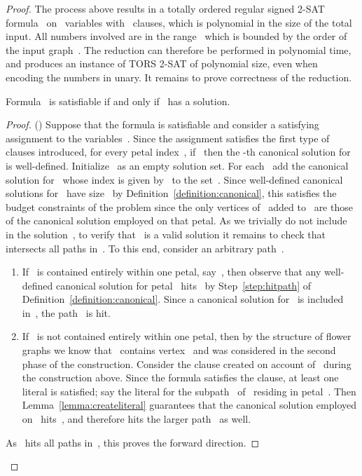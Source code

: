 \let\accentvec\vec  \documentclass{llncs}
\newcommand{\TORSTwoSat}{\textsc{TORS 2-SAT}\xspace}
\begin{document}
\begin{proof}
The process above results in a totally ordered regular signed 2-SAT formula~ on~ variables with~ clauses, which is polynomial in the size of the total input. All numbers involved are in the range~ which is bounded by the order of the input graph~. The reduction can therefore be performed in polynomial time, and produces an instance of \TORSTwoSat of polynomial size, even when encoding the numbers in unary. It remains to prove correctness of the reduction.

\begin{claim}
Formula~ is satisfiable if and only if~ has a solution.
\end{claim}
\begin{proof}
() Suppose that the formula is satisfiable and consider a satisfying assignment to the variables~. Since the assignment satisfies the first type of clauses introduced, for every petal index~, if~ then the -th canonical solution for~ is well-defined. Initialize~ as an empty solution set. For each~ add the canonical solution for~ whose index is given by~ to the set~. Since well-defined canonical solutions for~ have size~ by Definition~\ref{definition:canonical}, this satisfies the budget constraints of the problem since the only vertices of~ added to~ are those of the canonical solution employed on that petal. As we trivially do not include~ in the solution~, to verify that~ is a valid solution it remains to check that~ intersects all paths in~. To this end, consider an arbitrary path~.

\begin{enumerate}
	\item If~ is contained entirely within one petal, say~, then observe that any well-defined canonical solution for petal~ hits~ by Step~\ref{step:hitpath} of Definition~\ref{definition:canonical}. Since a canonical solution for~ is included in~, the path~ is hit.
	\item If~ is not contained entirely within one petal, then by the structure of flower graphs we know that~ contains vertex~ and was considered in the second phase of the construction. Consider the clause created on account of~ during the construction above. Since the formula satisfies the clause, at least one literal is satisfied; say the literal for the subpath~ of~ residing in petal~. Then Lemma~\ref{lemma:createliteral} guarantees that the canonical solution employed on~ hits~, and therefore hits the larger path~ as well.
\end{enumerate}

\noindent As~ hits all paths in~, this proves the forward direction.


\end{proof}
\end{proof}
\end{document}
